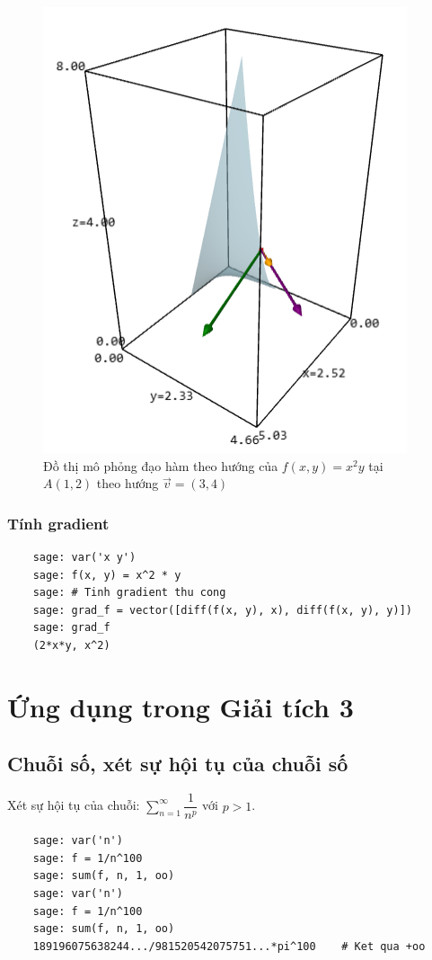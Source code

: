 \begin{figure}[H]
	\centering
	\includegraphics[width=0.7\linewidth]{images/5251}
	\caption{Đồ thị mô phỏng đạo hàm theo hướng của \( f(x, y) = x^2y \) tại \( A(1, 2) \) theo hướng \( \vec{v} = (3, 4) \)}
	\label{fig:5251}
\end{figure}

\subsubsection{Tính gradient}
\begin{lstlisting}
	sage: var('x y')
	sage: f(x, y) = x^2 * y
	sage: # Tinh gradient thu cong
	sage: grad_f = vector([diff(f(x, y), x), diff(f(x, y), y)])
	sage: grad_f
	(2*x*y, x^2)
\end{lstlisting}

\newpage
\section{Ứng dụng trong Giải tích 3}

\subsection{Chuỗi số, xét sự hội tụ của chuỗi số}
Xét sự hội tụ của chuỗi: $\sum_{n=1}^{\infty} \dfrac{1}{n^p}$ với $p>1$.
\begin{lstlisting}
	sage: var('n')
	sage: f = 1/n^100
	sage: sum(f, n, 1, oo)
	sage: var('n')
	sage: f = 1/n^100
	sage: sum(f, n, 1, oo)
	189196075638244.../981520542075751...*pi^100	# Ket qua +oo
\end{lstlisting}

